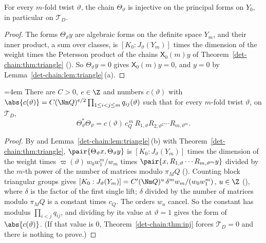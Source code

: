 \begin{theorem}\label{det-chain:thm:inj}
For every $m$-fold twist $\vartheta$, the chain $\Theta_\vartheta$ is injective on the principal
forms on $Y_0$, in particular on $\mathcal{T}_D$.
\end{theorem}

\begin{proof}
The forms $\Theta_\vartheta y$ are algebraic forms on the definite space $Y_m$, and their inner
product, a sum over classes, is $[K_0:J_\vartheta(Y_m)]$ times the dimension of the weight times
the Petersson product of the chains $\mathsf X_0(m)y$ of Theorem~\ref{det-chain:thm:triangle}
(). So $\Theta_\vartheta y=0$ gives $\mathsf X_0(m)y=0$, and
$y=0$ by Lemma~\ref{det-chain:lem:triangle}\,(a).
\end{proof}

\begin{theorem}
\label{det-chain:thm:norm}\emergencystretch=4em
There are $C>0$, $e\in\Z$ and numbers $c(\vartheta)$ with
$\abs{c(\vartheta)}=\allowbreak C(\Nm Q)^{e/2}\prod_{1\le i<j\le m}q_{ij}(\vartheta)$ such that for every
$m$-fold twist $\vartheta$, on $\mathcal{T}_D$,
\[
  \Theta_\vartheta^*\Theta_\vartheta
  =c(\vartheta)\,c_Q^{\,m}\,R_{1,\vartheta}R_{2,\vartheta^2}\cdots R_{m,\vartheta^m}.
\]
\end{theorem}

\begin{proof}
By  and Lemma~\ref{det-chain:lem:triangle}\,(b) with
Theorem~\ref{det-chain:thm:triangle}, $\pair{\Theta_\vartheta x,\Theta_\vartheta y}$ is
$[K_0:J_\vartheta(Y_m)]$ times the dimension of the weight times $\varpi(\vartheta)\,w_0w_1^m/w_m$ times
$\pair{x,R_{1,\vartheta}\cdots R_{m,\vartheta^m}y}$ divided by the $m$-th power of the number of
matrices modulo $\pi_MQ$ (). Counting block triangular
groups gives $[K_0:J_\vartheta(Y_m)]=C'(\Nm Q)^{u}\,\delta^m w_m/(w_0w_1^m)$, $u\in\Z$
(), where $\delta$ is the factor
 of the first single lift; $\delta$ divided by the number of
matrices modulo $\pi_MQ$ is a constant times $c_Q$. The orders $w_n$ cancel. So
the constant has modulus $\prod_{i<j}q_{ij}$, and dividing by its value at $\vartheta=1$ gives the
form of $\abs{c(\vartheta)}$. (If that value is $0$, Theorem~\ref{det-chain:thm:inj} forces
$\mathcal{T}_D=0$ and there is nothing to prove.)
\end{proof}

